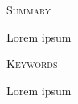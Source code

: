 {\scshape\Large Summary\par}
\vspace{0.5cm}
Lorem ipsum

\vspace{1cm}

{\scshape\Large Keywords\par}
\vspace{0.5cm}
Lorem ipsum

\afterpage{\blankpage}
\cleardoublepage